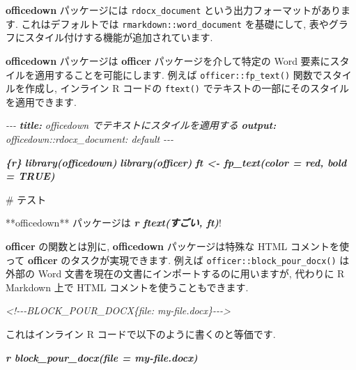 \documentclass[
  11pt,
  lualatex,ja=standard,jafont=noto]{bxjsreport}
\newenvironment{Shaded}{\begin{snugshade}}{\end{snugshade}}
\newcommand{\AnnotationTok}[1]{\textcolor[rgb]{0.56,0.35,0.01}{\textbf{\textit{#1}}}}
\newcommand{\CommentTok}[1]{\textcolor[rgb]{0.56,0.35,0.01}{\textit{#1}}}
\newcommand{\FunctionTok}[1]{\textcolor[rgb]{0.00,0.00,0.00}{#1}}
\newcommand{\InformationTok}[1]{\textcolor[rgb]{0.56,0.35,0.01}{\textbf{\textit{#1}}}}
\newcommand{\NormalTok}[1]{#1}
\begin{document}
\textbf{officedown} パッケージには \texttt{rdocx\_document} という出力フォーマットがあります. これはデフォルトでは \texttt{rmarkdown::word\_document} を基礎にして, 表やグラフにスタイル付けする機能が追加されています.

\textbf{officedown} パッケージは \textbf{officer} パッケージを介して特定の Word 要素にスタイルを適用することを可能にします. 例えば \texttt{officer::fp\_text()} 関数でスタイルを作成し, インライン R コードの \texttt{ftext()} でテキストの一部にそのスタイルを適用できます.

\begin{Shaded}
\begin{Highlighting}[]
\CommentTok{{-}{-}{-}}
\AnnotationTok{title:}\CommentTok{ officedown でテキストにスタイルを適用する}
\AnnotationTok{output:}
\CommentTok{  officedown::rdocx\_document: default}
\CommentTok{{-}{-}{-}}

\InformationTok{\textasciigrave{}\textasciigrave{}\textasciigrave{}\{r\}}
\InformationTok{library(officedown)}
\InformationTok{library(officer)}
\InformationTok{ft \textless{}{-} fp\_text(color = \textquotesingle{}red\textquotesingle{}, bold = TRUE)}
\InformationTok{\textasciigrave{}\textasciigrave{}\textasciigrave{}}

\FunctionTok{\# テスト}

\NormalTok{**officedown** パッケージは }\InformationTok{\textasciigrave{}r ftext(\textquotesingle{}すごい\textquotesingle{}, ft)\textasciigrave{}}\NormalTok{!}
\end{Highlighting}
\end{Shaded}

\textbf{officer} の関数とは別に, \textbf{officedown} パッケージは特殊な HTML コメントを使って \textbf{officer} のタスクが実現できます. 例えば \texttt{officer::block\_pour\_docx()} は外部の Word 文書を現在の文書にインポートするのに用いますが, 代わりに R Markdown 上で HTML コメントを使うこともできます.

\begin{Shaded}
\begin{Highlighting}[]
\CommentTok{\textless{}!{-}{-}{-}BLOCK\_POUR\_DOCX\{file: \textquotesingle{}my{-}file.docx\textquotesingle{}\}{-}{-}{-}\textgreater{}}
\end{Highlighting}
\end{Shaded}

これはインライン R コードで以下のように書くのと等価です.

\begin{Shaded}
\begin{Highlighting}[]
\InformationTok{\textasciigrave{}r block\_pour\_docx(file = \textquotesingle{}my{-}file.docx\textquotesingle{})\textasciigrave{}}
\end{Highlighting}
\end{Shaded}
\end{document}
